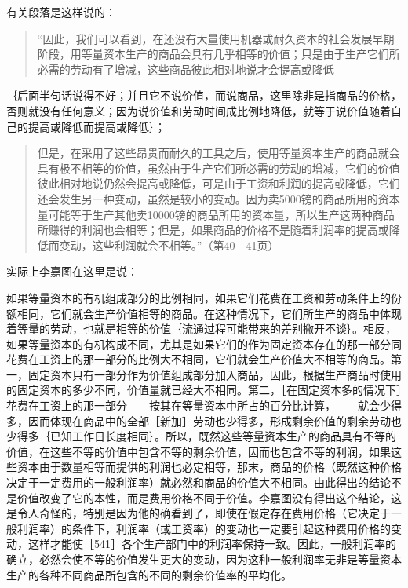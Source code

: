 有关段落是这样说的：

\begin{quote}{“因此，我们可以看到，在还没有大量使用机器或耐久资本的社会发展早期阶段，用等量资本生产的商品会具有几乎相等的价值；只是由于生产它们所必需的劳动有了增减，这些商品彼此相对地说才会提高或降低}\end{quote}

｛后面半句话说得不好；并且它不说价值，而说商品，这里除非是指商品的价格，否则就没有任何意义；因为说价值和劳动时间成比例地降低，就等于说价值随着自己的提高或降低而提高或降低｝；

\begin{quote}{但是，在采用了这些昂贵而耐久的工具之后，使用等量资本生产的商品就会具有极不相等的价值，虽然由于生产它们所必需的劳动的增减，它们的价值彼此相对地说仍然会提高或降低，可是由于工资和利润的提高或降低，它们还会发生另一种变动，虽然是较小的变动。因为卖5000镑的商品所用的资本量可能等于生产其他卖10000镑的商品所用的资本量，所以生产这两种商品所赚得的利润也会相等；但是，如果商品的价格不是随着利润率的提高或降低而变动，这些利润就会不相等。”（第40—41页）}\end{quote}

实际上李嘉图在这里是说：

如果等量资本的有机组成部分的比例相同，如果它们花费在工资和劳动条件上的份额相同，它们就会生产价值相等的商品。在这种情况下，它们所生产的商品中体现着等量的劳动，也就是相等的价值｛流通过程可能带来的差别撇开不谈｝。相反，如果等量资本的有机构成不同，尤其是如果它们的作为固定资本存在的那一部分同花费在工资上的那一部分的比例大不相同，它们就会生产价值大不相等的商品。第一，固定资本只有一部分作为价值组成部分加入商品，因此，根据生产商品时使用的固定资本的多少不同，价值量就已经大不相同。第二，［在固定资本多的情况下］花费在工资上的那一部分——按其在等量资本中所占的百分比计算，——就会少得多，因而体现在商品中的全部［新加］劳动也少得多，形成剩余价值的剩余劳动也少得多｛已知工作日长度相同｝。所以，既然这些等量资本生产的商品具有不等的价值，在这些不等的价值中包含不等的剩余价值，因而也包含不等的利润，如果这些资本由于数量相等而提供的利润也必定相等，那末，商品的价格（既然这种价格决定于一定费用的一般利润率）就必然和商品的价值大不相同。由此得出的结论不是价值改变了它的本性，而是费用价格不同于价值。李嘉图没有得出这个结论，这是令人奇怪的，特别是因为他的确看到了，即使在假定存在费用价格（它决定于一般利润率）的条件下，利润率（或工资率）的变动也一定要引起这种费用价格的变动，这样才能使［541］各个生产部门中的利润率保持一致。因此，一般利润率的确立，必然会使不等的价值发生更大的变动，因为这种一般利润率无非是等量资本生产的各种不同商品所包含的不同的剩余价值率的平均化。

